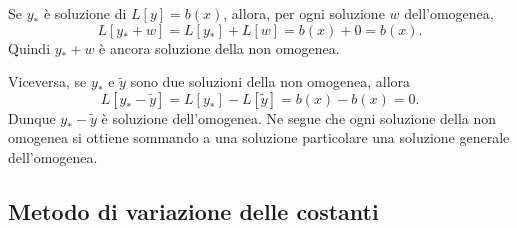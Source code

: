 \documentclass[a4paper]{article}
\begin{document}
\begin{radioactive}
\begin{snippetproof}{}
    Se \(y_\ast\) è soluzione di \(L[y]=b(x)\), allora, per ogni soluzione \(w\) dell'omogenea,
    \[
        L[y_\ast+w]=L[y_\ast]+L[w]=b(x)+0=b(x).
    \]
    Quindi \(y_\ast+w\) è ancora soluzione della non omogenea.

    Viceversa, se \(y_\ast\) e \(\widetilde{y}\) sono due soluzioni della non omogenea, allora
    \[
        L[y_\ast-\widetilde{y}]
        =
        L[y_\ast]-L[\widetilde{y}]
        =
        b(x)-b(x)=0.
    \]
    Dunque \(y_\ast-\widetilde{y}\) è soluzione dell'omogenea. Ne segue che ogni soluzione della non omogenea si ottiene sommando a una soluzione particolare una soluzione generale dell'omogenea.
\end{snippetproof}
\end{radioactive}

\subsection{Metodo di variazione delle costanti}
\end{document}
